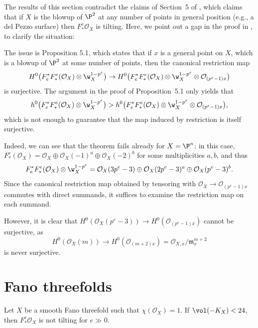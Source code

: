 \documentclass{article}
\def\O{\mathcal O}
\numberwithin{equation}{section}
\theoremstyle{theorem}
\numberwithin{thm}{section}
\theoremstyle{definition}
\begin{document}
\begin{rem}
\label{comparison}
The results of this section contradict the claims of Section~5 of \cite{samokhin}, which claims that if $X$ is the blowup of $\P^2$ at any number of points in general position (e.g., a del Pezzo surface) then $F_*^e\O_X$ is tilting.
Here, we point out a gap in the proof in \cite{samokhin}, to clarify the situation: 

The issue is Proposition 5.1, which states that if $x$ is a general point on $X$, which is a blowup of $\P^2$ at some number of points, then the canonical restriction map
$$
H^0\bigl(F^*_e F_*^e (\O_X)\otimes \w_X^{1-p^e}\bigr)\to 
H^0\bigl(F^*_e F_*^e (\O_X)\otimes \w_X^{1-p^e}\otimes \O_{(p^e-1)x}\bigr)
$$
is surjective.
The argument in the proof of Proposition~5.1 only yields that
$$
h^0\bigl(F^*_e F_*^e (\O_X)\otimes \w_X^{1-p^e}\bigr) >
h^0\bigl(F^*_e F_*^e (\O_X)\otimes \w_X^{1-p^e}\otimes \O_{(p^e-1)x}\bigr),
$$
which is not enough to guarantee that the map induced by restriction is itself surjective.

Indeed, we can see that the theorem fails already for $X=\P^n$: in this case, $F_*^e(\O_X)= \O_X\oplus \O_X(-1)^a\oplus\O_X(-2)^b$ for some multiplicities $a,b$, and thus
$$
F^*_e F_*^e (\O_X)\otimes \w_X^{1-p^e} = 
\O_X(3p^{e} - 3) \oplus 
\O_X(2p^{e} - 3)^a \oplus 
\O_X(p^{e} - 3)^b.
$$
Since the canonical restriction map obtained by tensoring with $\O_X\to \O_{(p^e-1)x}$ commutes with direct summands, it  suffices to examine the restriction map on each summand. 

However, it is clear that
$
H^0(\O_X(p^{e} - 3))\to H^0(\O_{(p^e-1)x})
$
cannot be surjective, as 
$$
 H^0(\O_X(m))\to H^0(\O_{(m+2)x}) = \O_{X,x}/\mathfrak m_{x}^{m+2}
$$
is never surjective.

\end{rem}

\section{Fano threefolds}
\label{3fold}

\begin{thm}
\label{main2}
Let $X$ be a smooth Fano threefold such that $\chi(\O_X)=1$. If $\vol(-K_X)< 24$, then $F_*^e\O_X$ is not tilting for $e\gg0$.
\end{thm}

%
\end{document}
